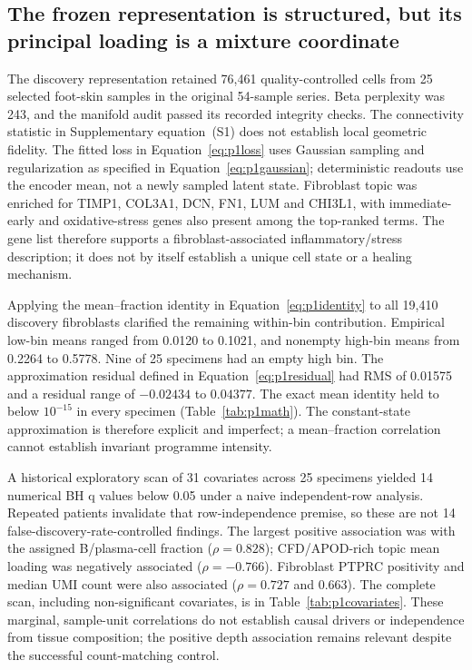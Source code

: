 \documentclass[10pt,a4paper]{article}
\begin{document}

\subsection{The frozen representation is structured, but its principal loading is a mixture coordinate}
The discovery representation retained 76,461 quality-controlled cells from 25 selected foot-skin samples in the original 54-sample series. Beta perplexity was 243, and the manifold audit passed its recorded integrity checks. The connectivity statistic in Supplementary equation~(S1) does not establish local geometric fidelity. The fitted loss in Equation~\eqref{eq:p1loss} uses Gaussian sampling and regularization as specified in Equation~\eqref{eq:p1gaussian}; deterministic readouts use the encoder mean, not a newly sampled latent state. Fibroblast topic was enriched for TIMP1, COL3A1, DCN, FN1, LUM and CHI3L1, with immediate-early and oxidative-stress genes also present among the top-ranked terms. The gene list therefore supports a fibroblast-associated inflammatory/stress description; it does not by itself establish a unique cell state or a healing mechanism.

Applying the mean--fraction identity in Equation~\eqref{eq:p1identity} to all 19,410 discovery fibroblasts clarified the remaining within-bin contribution. Empirical low-bin means ranged from 0.0120 to 0.1021, and nonempty high-bin means from 0.2264 to 0.5778. Nine of 25 specimens had an empty high bin. The approximation residual defined in Equation~\eqref{eq:p1residual} had RMS of 0.01575 and a residual range of $-0.02434$ to $0.04377$. The exact mean identity held to below $10^{-15}$ in every specimen (Table~\ref{tab:p1math}). The constant-state approximation is therefore explicit and imperfect; a mean--fraction correlation cannot establish invariant programme intensity.

A historical exploratory scan of 31 covariates across 25 specimens yielded 14 numerical BH q values below 0.05 under a naive independent-row analysis. Repeated patients invalidate that row-independence premise, so these are not 14 false-discovery-rate-controlled findings. The largest positive association was with the assigned B/plasma-cell fraction ($\rho=0.828$); CFD/APOD-rich topic mean loading was negatively associated ($\rho=-0.766$). Fibroblast PTPRC positivity and median UMI count were also associated ($\rho=0.727$ and 0.663). The complete scan, including non-significant covariates, is in Table~\ref{tab:p1covariates}. These marginal, sample-unit correlations do not establish causal drivers or independence from tissue composition; the positive depth association remains relevant despite the successful count-matching control.
\end{document}
